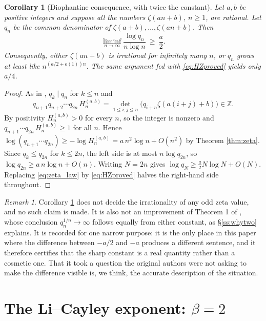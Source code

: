 \documentclass[11pt]{amsart}
\numberwithin{equation}{section}
\theoremstyle{plain}
\newtheorem{corollary}[theorem]{Corollary}
\theoremstyle{definition}
\theoremstyle{remark}
\newtheorem{remark}[theorem]{Remark}
\begin{document}
\begin{corollary}[Diophantine consequence, with twice the constant]
\label{cor:diophantine}
Let $a,b$ be positive integers and suppose all the numbers $\zeta(an+b)$, $n\ge1$, are rational.
Let $q_{n}$ be the common denominator of $\zeta(a+b),\dots,\zeta(an+b)$. Then
\begin{equation}
\liminf_{n\to\infty}\frac{\log q_{n}}{n\log n}\ \ge\ \frac a2 .
\end{equation}
Consequently, either $\zeta(an+b)$ is irrational for infinitely many $n$, or $q_{n}$ grows at least
like $n^{(a/2+o(1))n}$. The same argument fed with \eqref{eq:HZproved} yields only $a/4$.
\end{corollary}

\begin{proof}
As in \cite{HaynesZudilin2015}, $q_{k}\mid q_{n}$ for $k\le n$ and
\[
q_{n+1}q_{n+2}\cdots q_{2n}\,H_{n}^{(a,b)}=\det_{1\le i,j\le n}\bigl(q_{i+n}\zeta(a(i+j)+b)\bigr)\in\mathbb Z .
\]
By positivity $H_{n}^{(a,b)}>0$ for every $n$, so the integer is nonzero and
$q_{n+1}\cdots q_{2n}\,H_{n}^{(a,b)}\ge1$ for all $n$. Hence
$\log(q_{n+1}\cdots q_{2n})\ge-\log H_{n}^{(a,b)}=a\,n^{2}\log n+O(n^{2})$ by Theorem \ref{thm:zeta}.
Since $q_{k}\le q_{2n}$ for $k\le2n$, the left side is at most $n\log q_{2n}$, so
$\log q_{2n}\ge a\,n\log n+O(n)$. Writing $N=2n$ gives
$\log q_{N}\ge\tfrac a2N\log N+O(N)$. Replacing \eqref{eq:zeta_law} by \eqref{eq:HZproved}
halves the right-hand side throughout.
\end{proof}

\begin{remark}
Corollary \ref{cor:diophantine} does not decide the irrationality of any odd zeta value, and no such
claim is made. It is also not an improvement of Theorem 1 of \cite{HaynesZudilin2015}, whose
conclusion $q_{n}^{1/n}\to\infty$ follows equally from either constant, as \S\ref{ss:whytwo}
explains. It is recorded for one narrow purpose: it is the only place in this paper where the
difference between $-a/2$ and $-a$ produces a different sentence, and it therefore certifies that
the sharp constant is a real quantity rather than a cosmetic one. That it took a question the
original authors were not asking to make the difference visible is, we think, the accurate
description of the situation.
\end{remark}

\section{The Li--Cayley exponent: $\beta=2$}
\label{sec:cayley}
\end{document}
